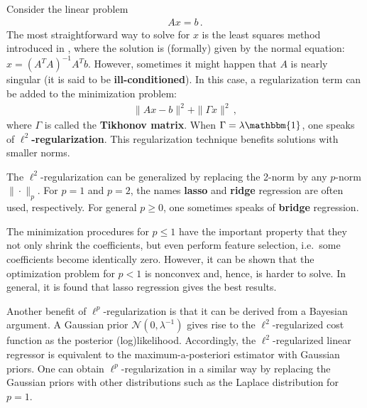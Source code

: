     \begin{method}{
        Consider the linear problem
        \begin{gather}
            Ax = b\,.
        \end{gather}
        The most straightforward way to solve for $x$ is the least squares method introduced in , where the solution is (formally) given by the normal equation: $x=(A^TA)^{-1}A^Tb$. However, sometimes it might happen that $A$ is nearly singular (it is said to be \textbf{ill-conditioned}). In this case, a regularization term can be added to the minimization problem:
        \begin{gather}
            \|Ax-b\|^2+\|\Gamma x\|^2\,,
        \end{gather}
        where $\Gamma$ is called the \textbf{Tikhonov matrix}. When $\Gamma=\lambda\mathbbm{1}$, one speaks of \textbf{$\ell^2$-regularization}. This regularization technique benefits solutions with smaller norms.
    }
    \end{method}
    \begin{remark}
        The $\ell^2$-regularization can be generalized by replacing the 2-norm by any $p$-norm $\|\cdot\|_p$. For $p=1$ and $p=2$, the names \textbf{lasso} and \textbf{ridge} regression are often used, respectively. For general $p\geq0$, one sometimes speaks of \textbf{bridge} regression.

        The minimization procedures for $p\leq1$ have the important property that they not only shrink the coefficients, but even perform feature selection, i.e.~some coefficients become identically zero. However, it can be shown that the optimization problem for $p<1$ is nonconvex and, hence, is harder to solve. In general, it is found that lasso regression gives the best results.

        Another benefit of $\ell^p$-regularization is that it can be derived from a Bayesian argument. A Gaussian prior $\mathcal{N}(0,\lambda^{-1})$ gives rise to the $\ell^2$-regularized cost function as the posterior (log)likelihood. Accordingly, the $\ell^2$-regularized linear regressor is equivalent to the maximum-a-posteriori estimator with Gaussian priors. One can obtain $\ell^p$-regularization in a similar way by replacing the Gaussian priors with other distributions such as the Laplace distribution for $p=1$.
    \end{remark}

